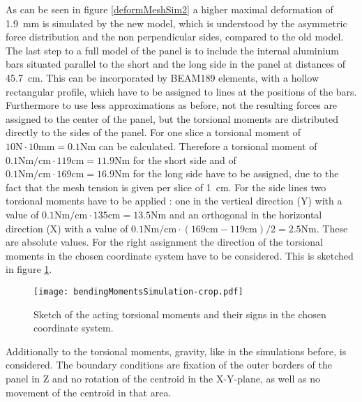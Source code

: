 \documentclass[
a4paper,                                %
twoside,                                %
BCOR1.4cm,                      %
10pt,                           %
headings=normal,                %
headsepline,                    %
clearplainpage, %
final,                                  %
div=14,
parskip=full,
openright,
bibliography=toc
]{scrreprt}
\begin{document}
As can be seen in figure \ref{deformMeshSim2} a higher maximal deformation of \SI{1.9}{\mm} is simulated by the new model, which is understood by the asymmetric force distribution and the non perpendicular sides, compared to the old model. The last step to a full model of the panel is to include the internal aluminium bars situated parallel to the short and the long side in the panel at distances of \SI{45.7}{\cm}. This can be incorporated by BEAM189 elements, with a hollow rectangular profile, which have to be assigned to lines at the positions of the bars. Furthermore to use less approximations as before, not the resulting forces are assigned to the center of the panel, but the torsional moments are distributed directly to the sides of the panel. For one slice a torsional moment of $10\mathrm{N}\cdot10\mathrm{mm}=0.1\mathrm{Nm}$ can be calculated. Therefore a torsional moment of $0.1\mathrm{Nm/cm}\cdot119\mathrm{cm}=11.9\mathrm{Nm}$ for the short side and of $0.1\mathrm{Nm/cm}\cdot169\mathrm{cm}=16.9\mathrm{Nm}$ for the long side have to be assigned, due to the fact that the mesh tension is given per slice of \SI{1}{\cm}. For the side lines two torsional moments have to be applied : one in the vertical direction (Y) with a value of $0.1\mathrm{Nm/cm}\cdot135\mathrm{cm}=13.5\mathrm{Nm}$ and an orthogonal in the horizontal direction (X) with a value of $0.1\mathrm{Nm/cm}\cdot(169\mathrm{cm}-119\mathrm{cm})/2=2.5\mathrm{Nm}$. These are absolute values. For the right assignment the direction of the torsional moments in the chosen coordinate system have to be considered. This is sketched in figure \ref{bendingMomentsSigns}.

\begin{figure}[H]
	\centering
	\texttt{[image: bendingMomentsSimulation-crop.pdf]}
	\caption{Sketch of the acting torsional moments and their signs in the chosen coordinate system. }
	\label{bendingMomentsSigns}
\end{figure}

Additionally to the torsional moments, gravity, like in the simulations before, is considered. The boundary conditions are fixation of the outer borders of the panel in Z and no rotation of the centroid in the X-Y-plane, as well as no movement of the centroid in that area. 
\end{document}
